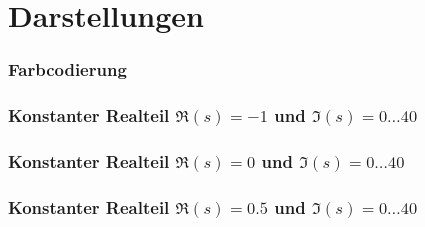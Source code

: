 \documentclass[ngerman, aspectratio=169]{beamer}
\begin{document}
    \section{Darstellungen}

    \begin{frame}
        \frametitle{Farbcodierung}
        \begin{center}
            \scalebox{0.6}{}
        \end{center}
    \end{frame}

    \begin{frame}
        \frametitle{Konstanter Realteil $\Re(s)=-1$ und $\Im(s)=0\ldots40$}
        \begin{center}
            \scalebox{0.6}{}
        \end{center}
    \end{frame}
    \begin{frame}
        \frametitle{Konstanter Realteil $\Re(s)=0$ und $\Im(s)=0\ldots40$}
        \begin{center}
            \scalebox{0.6}{}
        \end{center}
    \end{frame}
    \begin{frame}
        \frametitle{Konstanter Realteil $\Re(s)=0.5$ und $\Im(s)=0\ldots40$}
        \begin{center}
            \scalebox{0.6}{}
        \end{center}
    \end{frame}
\end{document}
